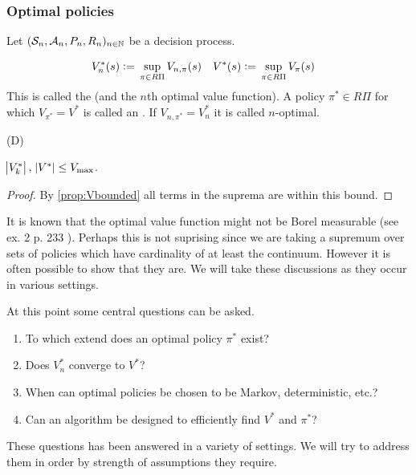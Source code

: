 \subsubsection{Optimal policies}

Let $(\mathcal{S}_n, \mathcal{A}_n, P_n, R_n)_{n \in \mathbb{N}}$ be a decision process.

\begin{defn} 
  \begin{align*}
    V_n^*(s) \vcentcolon= & \; \sup_{\pi \in R\Pi} V_{n,\pi}(s) &
    V^*(s) \vcentcolon= & \; \sup_{\pi \in R\Pi} V_\pi(s)
  \end{align*}
  This is called the  (and the $n$th
  optimal value function).
  A policy $\pi^* \in R\Pi$ for which $V_{\pi^*} = V^*$ is called an
  .
  If $V_{n, \pi^*} = V^*_n$ it is called $n$-optimal.
  \label{defn:optimalValue}
\end{defn}

\begin{prop} (D)

  $\abs{V^*_k},\; \abs{V^*} \leq V_{\max}$.
\end{prop}
\begin{proof}
  By \cref{prop:Vbounded} all terms in the suprema are within this bound.
\end{proof}

\begin{rem}
It is known that the optimal value function
might not be Borel measurable (see ex. 2 p. 233 ).
Perhaps this is not suprising since we are taking a supremum over
sets of policies which have cardinality of at least the continuum.
However it is often possible to show that they are.
We will take these discussions as they occur in various settings.
\end{rem}

At this point some central questions can be asked.
\begin{enumerate}
  \item To which extend does an optimal policy $\pi^*$ exist?
  \item Does $V_n^*$ converge to $V^*$?
  \item When can optimal policies be chosen to be Markov, deterministic, etc.?
  \item Can an algorithm be designed to efficiently find $V^*$ and
    $\pi^*$?
\end{enumerate}
These questions has been answered in a variety of settings.
We will try to address them in order by strength of assumptions
they require.

